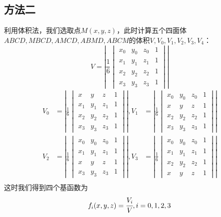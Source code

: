 \documentclass[12pt,a4paper]{article}
\begin{document}
\subsection{方法二}
利用体积法，我们选取点$M(x,y,z)$，此时计算五个四面体$ABCD,MBCD,AMCD,ABMD,ABCM$的体积$V,V_0,V_1,V_2,V_3,V_4$：
$$V=\left| \frac{1}{6}\begin{vmatrix}
x_0&y_0&z_0&1\\x_1&y_1&z_1&1\\x_2&y_2&z_2&1\\x_3&y_3&z_3&1
\end{vmatrix}\right| $$
$$\begin{aligned}V_0&=\left| \frac{1}{6}\begin{vmatrix}
x&y&z&1\\x_1&y_1&z_1&1\\x_2&y_2&z_2&1\\x_3&y_3&z_3&1
\end{vmatrix}\right|,V_1&=\left| \frac{1}{6}\begin{vmatrix}
x_0&y_0&z_0&1\\x&y&z&1\\x_2&y_2&z_2&1\\x_3&y_3&z_3&1
\end{vmatrix}\right|  \\
V_2&=\left| \frac{1}{6}\begin{vmatrix}
x_0&y_0&z_0&1\\x_1&y_1&z_1&1\\x&y&z&1\\x_3&y_3&z_3&1
\end{vmatrix}\right|,V_3&=\left| \frac{1}{6}\begin{vmatrix}
x_0&y_0&z_0&1\\x_1&y_1&z_1&1\\x_2&y_2&z_2&1\\x&y&z&1
\end{vmatrix}\right|   \\
\end{aligned}$$
这时我们得到四个基函数为\begin{equation}
f_i(x,y,z)=\cfrac{V_i}{V},i=0,1,2,3
\label{equation3.3}
\end{equation}
\end{document}
